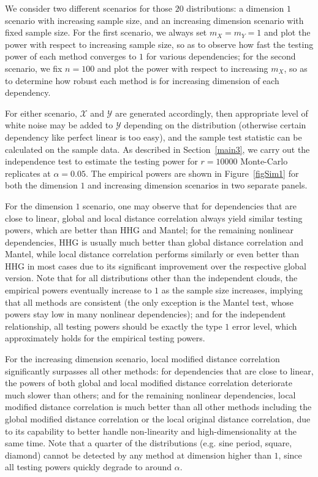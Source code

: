 \documentclass[12pt]{article}
\begin{document}
We consider two different scenarios for those $20$ distributions: a dimension $1$ scenario with increasing sample size, and an increasing dimension scenario with fixed sample size. For the first scenario, we always set $m_{X}=m_{Y}=1$ and plot the power with respect to increasing sample size, so as to observe how fast the testing power of each method converges to $1$ for various dependencies; for the second scenario, we fix $n=100$ and plot the power with respect to increasing $m_{X}$, so as to determine how robust each method is for increasing dimension of each dependency. 

For either scenario, $\mathcal{X}$ and $\mathcal{Y}$ are generated accordingly, then appropriate level of white noise may be added to $\mathcal{Y}$ depending on the distribution (otherwise certain dependency like perfect linear is too easy), and the sample test statistic can be calculated on the sample data. As described in Section~\ref{main3}, we carry out the independence test to estimate the testing power for $r=10000$ Monte-Carlo replicates at $\alpha=0.05$. The empirical powers are shown in Figure~\ref{figSim1} for both the dimension $1$ and increasing dimension scenarios in two separate panels. 

For the dimension $1$ scenario, one may observe that for dependencies that are close to linear, global and local distance correlation always yield similar testing powers, which are better than HHG and Mantel; for the remaining nonlinear dependencies, HHG is usually much better than global distance correlation and Mantel, while local distance correlation performs similarly or even better than HHG in most cases due to its significant improvement over the respective global version. Note that for all distributions other than the independent clouds, the empirical powers eventually increase to $1$ as the sample size increases, implying that all methods are consistent (the only exception is the Mantel test, whose powers stay low in many nonlinear dependencies); and for the independent relationship, all testing powers should be exactly the type $1$ error level, which approximately holds for the empirical testing powers. 

For the increasing dimension scenario, local modified distance correlation significantly surpasses all other methods: for dependencies that are close to linear, the powers of both global and local modified distance correlation deteriorate much slower than others; and for the remaining nonlinear dependencies, local modified distance correlation is much better than all other methods including the global modified distance correlation or the local original distance correlation, due to its capability to better handle non-linearity and high-dimensionality at the same time. Note that a quarter of the distributions (e.g. sine period, square, diamond) cannot be detected by any method at dimension higher than $1$, since all testing powers quickly degrade to around $\alpha$.
\end{document}
